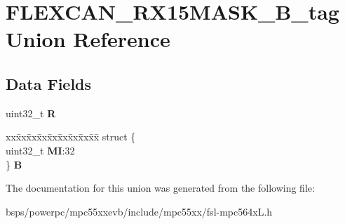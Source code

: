 \hypertarget{unionFLEXCAN__RX15MASK__32B__tag}{}\section{F\+L\+E\+X\+C\+A\+N\+\_\+\+R\+X15\+M\+A\+S\+K\+\_\+B\+\_\+tag Union Reference}
\label{unionFLEXCAN__RX15MASK__32B__tag}
\subsection*{Data Fields}
\begin{DoxyCompactItemize}
\item 
\mbox{\label{unionFLEXCAN__RX15MASK__32B__tag_a29dd1b84ff32e53f7a85c62fbf3fa872}} 
uint32\+\_\+t {\bfseries R}
\item 
\mbox{\label{unionFLEXCAN__RX15MASK__32B__tag_ab6705d02acd45ba6cb79ada58f86d497}} 
\begin{tabbing}
xx\=xx\=xx\=xx\=xx\=xx\=xx\=xx\=xx\=\kill
struct \{\\
\>uint32\_t {\bfseries MI}:32\\
\} {\bfseries B}\\

\end{tabbing}\end{DoxyCompactItemize}


The documentation for this union was generated from the following file\+:\begin{DoxyCompactItemize}
\item 
bsps/powerpc/mpc55xxevb/include/mpc55xx/fsl-\/mpc564x\+L.\+h\end{DoxyCompactItemize}
